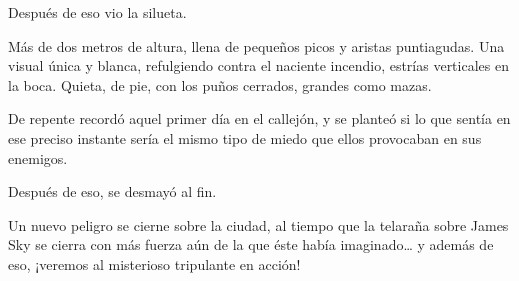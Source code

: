 Después de eso vio la silueta.

Más de dos metros de altura, llena de pequeños picos y aristas puntiagudas. Una visual única y blanca, refulgiendo contra el naciente incendio, estrías verticales en la boca. Quieta, de pie, con los puños cerrados, grandes como mazas.

De repente recordó aquel primer día en el callejón, y se planteó si lo que sentía en ese preciso instante sería el mismo tipo de miedo que ellos provocaban en sus enemigos.

Después de eso, se desmayó al fin.

\begin{next}
    Un nuevo peligro se cierne sobre la ciudad, al tiempo que la telaraña sobre James Sky se cierra con más fuerza aún de la que éste había imaginado\dots{} y además de eso, ¡veremos al misterioso tripulante en acción!
\end{next}

\endinput
